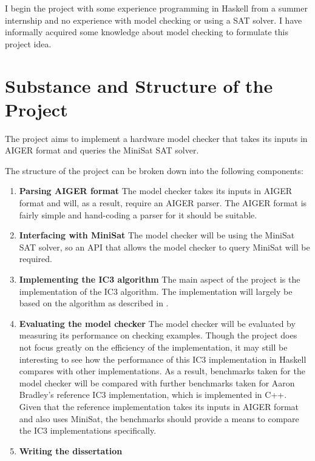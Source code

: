 \documentclass[12pt,a4paper,twoside]{article}
\begin{document}
I begin the project with some experience programming in Haskell
from a summer internship and no experience with model checking or using
a SAT solver. I have informally acquired some knowledge about model checking
to formulate this project idea.

\section*{Substance and Structure of the Project}

The project aims to implement a hardware model checker that takes its
inputs in AIGER format and queries the MiniSat SAT solver.

\noindent The structure of the project can be broken down into the following
components:

\begin{enumerate}

\item {\bf Parsing AIGER format} The model checker takes its inputs in AIGER
format and will, as a result, require an AIGER parser. The AIGER format
is fairly simple and hand-coding a parser for it should be suitable.

\item {\bf Interfacing with MiniSat} The model checker
will be using the MiniSat SAT solver, so an API that allows the
model checker to query MiniSat will be required.

\item {\bf Implementing the IC3 algorithm} 
The main aspect of the project is the implementation of the IC3 algorithm.
The implementation will largely be based on the algorithm as described in
\cite{bradley11,bradley12}. 

\item {\bf Evaluating the model checker}
The model checker will be evaluated by measuring its performance on
checking examples. Though the project does not focus greatly on the
efficiency of the implementation, it may still be interesting to
see how the performance of this IC3 implementation in Haskell compares with
other implementations. As a result, benchmarks taken for the
model checker will be compared with further benchmarks taken for
Aaron Bradley's reference IC3 implementation, which is
implemented in C++.
Given that the reference implementation takes its inputs in AIGER format
and also uses MiniSat, the benchmarks should provide a means to compare
the IC3 implementations specifically.

\item {\bf Writing the dissertation}

\end{enumerate}
\end{document}
